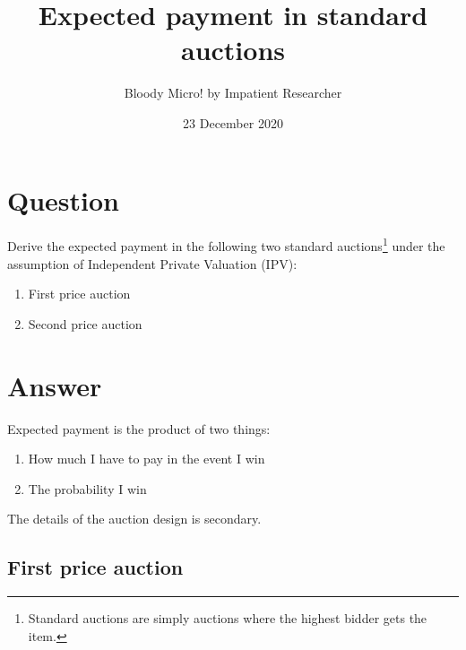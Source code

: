 \documentclass{tufte-handout}
\title{Expected payment in standard auctions}
\author{Bloody Micro! by Impatient Researcher}
\date{23 December 2020}  %
\begin{document}
\maketitle%


\section{Question}\label{sec:question}

Derive the expected payment in the following two standard auctions\footnote{Standard auctions are simply auctions where the highest bidder gets the item.} under the assumption of Independent Private Valuation (IPV):
\begin{enumerate}
    \item First price auction
    \item Second price auction
\end{enumerate}

\section{Answer}\label{sec:answer}

Expected payment is the product of two things:
\begin{enumerate}
    \item How much I have to pay in the event I win
    \item The probability I win
\end{enumerate}

The details of the auction design is secondary.

\subsection{First price auction}
\end{document}
